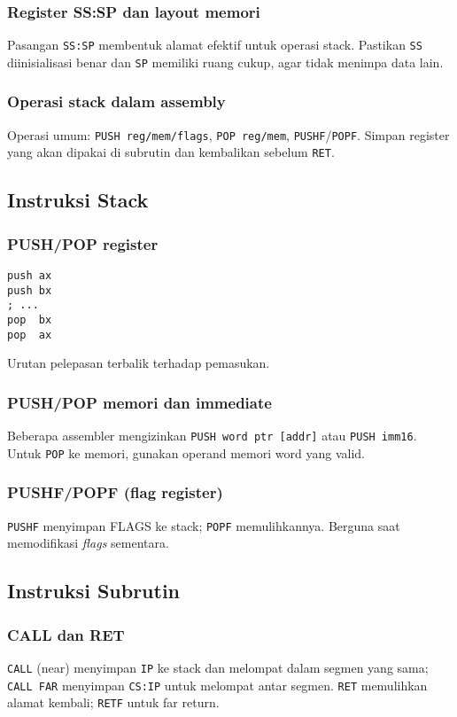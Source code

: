 \documentclass[../main.tex]{subfiles}
\begin{document}
\subsubsection{Register SS:SP dan layout memori}
Pasangan \texttt{SS:SP} membentuk alamat efektif untuk operasi stack. Pastikan \texttt{SS} diinisialisasi benar dan \texttt{SP} memiliki ruang cukup, agar tidak menimpa data lain.

\subsubsection{Operasi stack dalam assembly}
Operasi umum: \texttt{PUSH reg/mem/flags}, \texttt{POP reg/mem}, \texttt{PUSHF}/\texttt{POPF}. Simpan register yang akan dipakai di subrutin dan kembalikan sebelum \texttt{RET}.

\subsection{Instruksi Stack}
\subsubsection{PUSH/POP register}
\begin{verbatim}
push ax
push bx
; ...
pop  bx
pop  ax
\end{verbatim}
Urutan pelepasan terbalik terhadap pemasukan.

\subsubsection{PUSH/POP memori dan immediate}
Beberapa assembler mengizinkan \texttt{PUSH word ptr [addr]} atau \texttt{PUSH imm16}. Untuk \texttt{POP} ke memori, gunakan operand memori word yang valid.

\subsubsection{PUSHF/POPF (flag register)}
\texttt{PUSHF} menyimpan FLAGS ke stack; \texttt{POPF} memulihkannya. Berguna saat memodifikasi \textit{flags} sementara.

\subsection{Instruksi Subrutin}
\subsubsection{CALL dan RET}
\texttt{CALL} (near) menyimpan \texttt{IP} ke stack dan melompat dalam segmen yang sama; \texttt{CALL FAR} menyimpan \texttt{CS:IP} untuk melompat antar segmen. \texttt{RET} memulihkan alamat kembali; \texttt{RETF} untuk far return.
\end{document}
